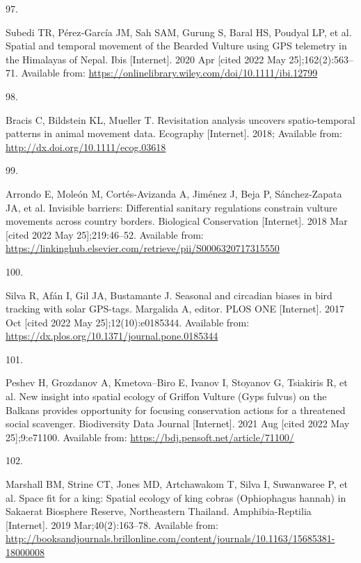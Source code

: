 \documentclass[10pt,a4paper]{article}
\newlength{\cslhangindent}
\newlength{\csllabelwidth}
\newlength{\cslentryspacingunit} %
\newenvironment{CSLReferences}[2] %
 {%
  \setlength{\parindent}{0pt}
  \ifodd #1
  \let\oldpar\par
  \def\par{\hangindent=\cslhangindent\oldpar}
  \fi
  \setlength{\parskip}{#2\cslentryspacingunit}
 }%
 {}
\newcommand{\CSLLeftMargin}[1]{\parbox[t]{\csllabelwidth}{#1}}
\newcommand{\CSLRightInline}[1]{\parbox[t]{\linewidth - \csllabelwidth}{#1}\break}
\begin{document}
\begin{CSLReferences}{0}{0}
\leavevmode\hypertarget{ref-subedi_spatial_2020}{}%
\CSLLeftMargin{97. }
\CSLRightInline{Subedi TR, Pérez‐García JM, Sah SAM, Gurung S, Baral HS, Poudyal LP, et al. Spatial and temporal movement of the {Bearded} {Vulture} using {GPS} telemetry in the {Himalayas} of {Nepal}. Ibis {[}Internet{]}. 2020 Apr {[}cited 2022 May 25{]};162(2):563--71. Available from: \url{https://onlinelibrary.wiley.com/doi/10.1111/ibi.12799}}

\leavevmode\hypertarget{ref-bracis_revisitation_2018}{}%
\CSLLeftMargin{98. }
\CSLRightInline{Bracis C, Bildstein KL, Mueller T. Revisitation analysis uncovers spatio-temporal patterns in animal movement data. Ecography {[}Internet{]}. 2018; Available from: \url{http://dx.doi.org/10.1111/ecog.03618}}

\leavevmode\hypertarget{ref-arrondo_invisible_2018}{}%
\CSLLeftMargin{99. }
\CSLRightInline{Arrondo E, Moleón M, Cortés-Avizanda A, Jiménez J, Beja P, Sánchez-Zapata JA, et al. Invisible barriers: {Differential} sanitary regulations constrain vulture movements across country borders. Biological Conservation {[}Internet{]}. 2018 Mar {[}cited 2022 May 25{]};219:46--52. Available from: \url{https://linkinghub.elsevier.com/retrieve/pii/S0006320717315550}}

\leavevmode\hypertarget{ref-silva_seasonal_2017}{}%
\CSLLeftMargin{100. }
\CSLRightInline{Silva R, Afán I, Gil JA, Bustamante J. Seasonal and circadian biases in bird tracking with solar {GPS}-tags. Margalida A, editor. PLOS ONE {[}Internet{]}. 2017 Oct {[}cited 2022 May 25{]};12(10):e0185344. Available from: \url{https://dx.plos.org/10.1371/journal.pone.0185344}}

\leavevmode\hypertarget{ref-peshev_new_2021}{}%
\CSLLeftMargin{101. }
\CSLRightInline{Peshev H, Grozdanov A, Kmetova--Biro E, Ivanov I, Stoyanov G, Tsiakiris R, et al. New insight into spatial ecology of {Griffon} {Vulture} ({Gyps} fulvus) on the {Balkans} provides opportunity for focusing conservation actions for a threatened social scavenger. Biodiversity Data Journal {[}Internet{]}. 2021 Aug {[}cited 2022 May 25{]};9:e71100. Available from: \url{https://bdj.pensoft.net/article/71100/}}

\leavevmode\hypertarget{ref-Marshall2018}{}%
\CSLLeftMargin{102. }
\CSLRightInline{Marshall BM, Strine CT, Jones MD, Artchawakom T, Silva I, Suwanwaree P, et al. Space fit for a king: Spatial ecology of king cobras ({Ophiophagus} hannah) in {Sakaerat} {Biosphere} {Reserve}, {Northeastern} {Thailand}. Amphibia-Reptilia {[}Internet{]}. 2019 Mar;40(2):163--78. Available from: \url{http://booksandjournals.brillonline.com/content/journals/10.1163/15685381-18000008}}


\end{CSLReferences}
\end{document}
